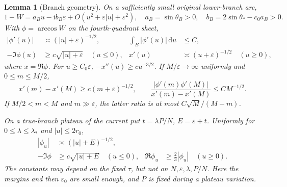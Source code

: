 \documentclass[11pt]{article}
\numberwithin{equation}{section}
\newtheorem{lemma}[theorem]{Lemma}
\theoremstyle{definition}
\newcommand{\dd}{\,\mathrm d}
\newcommand{\ii}{\mathrm i}
\newcommand{\eps}{\varepsilon}
\begin{document}
\begin{lemma}[Branch geometry]\label{lem:branch}
On a sufficiently small original lower-branch arc,
\[
 1-W=a_Bu-\ii b_B\eps+O(u^2+\eps|u|+\eps^2),
 \quad a_B=\sin\theta_B>0,\quad b_B=2\sin\theta_*-c_0a_B>0.
\]
With \(\phi=\arccos W\) on the fourth-quadrant sheet,
\begin{align*}
 |\phi'(u)|&\asymp(|u|+\eps)^{-1/2},&
 \int_B|\phi'(u)|\dd u&\le C,\\
 -\Im\phi(u)&\ge c\sqrt{|u|+\eps}\quad(u\le0),&
 x'(u)&\asymp(u+\eps)^{-1/2}\quad(u\ge0),
\end{align*}
where \(x=\Re\phi\).
For \(u\ge C_0\eps\), \(-x''(u)\ge c u^{-3/2}\).
If \(M/\eps\to\infty\) uniformly and \(0\le m\le M/2\),
\[
 x'(m)-x'(M)\ge c(m+\eps)^{-1/2},\qquad
 \frac{|\phi'(m)\phi'(M)|}{x'(m)-x'(M)}\le C M^{-1/2}.
\]
If \(M/2<m<M\) and \(m\gg\eps\), the latter ratio is at most
\(C\sqrt M/(M-m)\).

On a true-branch plateau of the current put
\(t=\lambda P/N\), \(E=\eps+t\). Uniformly for
\(0\le\lambda\le\lambda_*\) and \(|u|\le2r_0\),
\begin{align*}
 |\phi_u|&\asymp(|u|+E)^{-1/2},\\
 -\Im\phi&\ge c\sqrt{|u|+E}\quad(u\le0),&
 \Re\phi_u&\ge\tfrac23|\phi_u|\quad(u\ge0).
\end{align*}
The constants may depend on the fixed \(\tau\), but not on
\(N,\eps,\lambda,P/N\). Here the margins and then \(\eps_0\)
are small enough, and \(P\) is fixed during a plateau variation.
\end{lemma}
\end{document}
